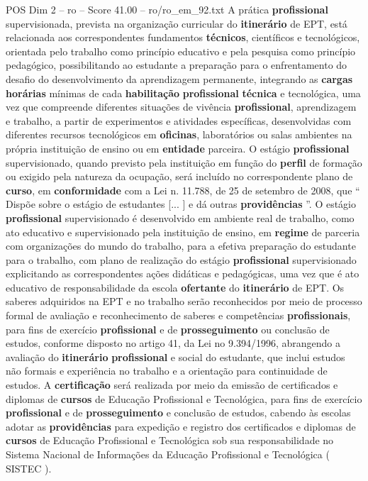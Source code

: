 \begin{textsample}{POS Dim 2 – ro – Score 41.00 – ro/ro\_em\_92.txt}
A prática \textbf{profissional} supervisionada, prevista na organização curricular do \textbf{itinerário} de EPT, está relacionada aos correspondentes fundamentos \textbf{técnicos}, científicos e tecnológicos, orientada pelo trabalho como princípio educativo e pela pesquisa como princípio pedagógico, possibilitando ao estudante a preparação para o enfrentamento do desafio do desenvolvimento da aprendizagem permanente, integrando as \textbf{cargas} \textbf{horárias} mínimas de cada \textbf{habilitação} \textbf{profissional} \textbf{técnica} e tecnológica, uma vez que compreende diferentes situações de vivência \textbf{profissional}, aprendizagem e trabalho, a partir de experimentos e atividades específicas, desenvolvidas com diferentes recursos tecnológicos em \textbf{oficinas}, laboratórios ou salas ambientes na própria instituição de ensino ou em \textbf{entidade} parceira.
O estágio \textbf{profissional} supervisionado, quando previsto pela instituição em função do \textbf{perfil} de formação ou exigido pela natureza da ocupação, será incluído no correspondente plano de \textbf{curso}, em \textbf{conformidade} com a Lei n. 11.788, de 25 de setembro de 2008, que “ Dispõe sobre o estágio de estudantes [... ] e dá outras \textbf{providências} ”.
O estágio \textbf{profissional} supervisionado é desenvolvido em ambiente real de trabalho, como ato educativo e supervisionado pela instituição de ensino, em \textbf{regime} de parceria com organizações do mundo do trabalho, para a efetiva preparação do estudante para o trabalho, com plano de realização do estágio \textbf{profissional} supervisionado explicitando as correspondentes ações didáticas e pedagógicas, uma vez que é ato educativo de responsabilidade da escola \textbf{ofertante} do \textbf{itinerário} de EPT.
Os saberes adquiridos na EPT e no trabalho serão reconhecidos por meio de processo formal de avaliação e reconhecimento de saberes e competências \textbf{profissionais}, para fins de exercício \textbf{profissional} e de \textbf{prosseguimento} ou conclusão de estudos, conforme disposto no artigo 41, da Lei no 9.394/1996, abrangendo a avaliação do \textbf{itinerário} \textbf{profissional} e social do estudante, que inclui estudos não formais e experiência no trabalho e a orientação para continuidade de estudos.
A \textbf{certificação} será realizada por meio da emissão de certificados e diplomas de \textbf{cursos} de Educação Profissional e Tecnológica, para fins de exercício \textbf{profissional} e de \textbf{prosseguimento} e conclusão de estudos, cabendo às escolas adotar as \textbf{providências} para expedição e registro dos certificados e diplomas de \textbf{cursos} de Educação Profissional e Tecnológica sob sua responsabilidade no Sistema Nacional de Informações da Educação Profissional e Tecnológica ( SISTEC ).

\end{textsample}
